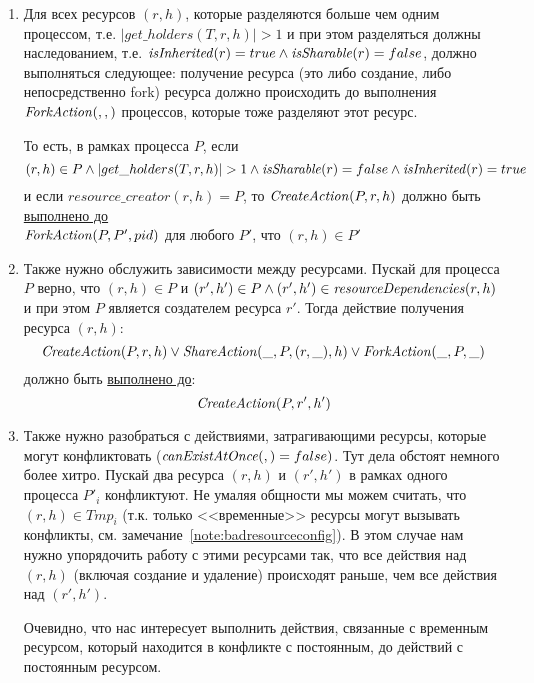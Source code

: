 \begin{enumerate}[label=(\arabic*)]
	\item \label{precrule:inherits} Для всех ресурсов $(r, h)$, которые разделяются больше чем одним процессом, т.е. $|get\_holders(T, r, h)| > 1$ и при этом разделяться должны наследованием, т.е. $\text{\textit{isInherited}}(r) = true \land \text{\textit{isSharable}}(r) = false$, должно выполняться следующее: получение ресурса (это либо создание, либо непосредственно fork) ресурса должно происходить до выполнения $\text{\textit{ForkAction}}(, , )$ процессов, которые тоже разделяют этот ресурс. 

	То есть, в рамках процесса $P$, если 
	\begin{equation*}
		(r, h) \in P \land |get\_holders(T, r, h)| > 1 \land \text{\textit{isSharable}}(r) = false \land \text{\textit{isInherited}}(r) = true
	\end{equation*}
	и если $resource\_creator{(r, h)} = P$, то $\text{\textit{CreateAction}}(P, r, h)$ должно быть \underline{выполнено до}\\ $\text{\textit{ForkAction}}(P, P', pid)$ для любого $P'$, что $(r, h) \in P'$

	\item \label{precrule:dependencies} Также нужно обслужить зависимости между ресурсами. Пускай для процесса $P$ верно, что $(r, h) \in P$ и $(r', h') \in P \land (r', h') \in \text{\textit{resourceDependencies}}(r, h)$ и при этом $P$ является создателем ресурса $r'$. Тогда действие получения ресурса $(r, h)$:
	\begin{equation*}
	    \text{\textit{CreateAction}}(P, r, h) \lor \text{\textit{ShareAction}}(\_, P, (r, \_), h) \lor \text{\textit{ForkAction}}(\_, P, \_)
	\end{equation*}
	должно быть \underline{выполнено до}:
	\begin{equation*}
		\text{\textit{CreateAction}}(P, r', h')
	\end{equation*}

	\item \label{precrule:canexistatonce} Также нужно разобраться с действиями, затрагивающими ресурсы, которые могут конфликтовать ($\text{\textit{canExistAtOnce}}(, ) = false)$. Тут дела обстоят немного более хитро. Пускай два ресурса $(r, h)$ и $(r', h')$ в рамках одного процесса $P'_i$ конфликтуют. Не умаляя общности мы можем считать, что $(r, h) \in Tmp_i$ (т.к. только <<временные>> ресурсы могут вызывать конфликты, см. замечание~\ref{note:badresourceconfig}). В этом случае нам нужно упорядочить работу с этими ресурсами так, что все действия над $(r, h)$ (включая создание и удаление) происходят раньше, чем все действия над $(r', h')$.

	Очевидно, что нас интересует выполнить действия, связанные с временным ресурсом, который находится в конфликте с постоянным, до действий с постоянным ресурсом.


\end{enumerate}
